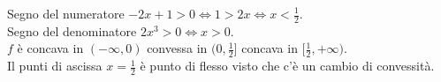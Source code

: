 \begin{example}
\begin{enumerate}
    Segno del numeratore $-2x + 1 > 0 \Longleftrightarrow 1 > 2x \Longleftrightarrow x < \frac{1}{2}$.\\
    Segno del denominatore $2x^3 > 0 \Longleftrightarrow x > 0$.\\
    $f$ è concava in $(-\infty, 0)$ \hspace{.3cm} convessa in $(0,\frac{1}{2}]$ \hspace{.3cm} concava in $[\frac{1}{2},
    +\infty)$.\\
    Il punti di ascissa $x=\frac{1}{2}$ è punto di flesso visto che c'è un cambio di convessità.
\end{enumerate}
\end{example}